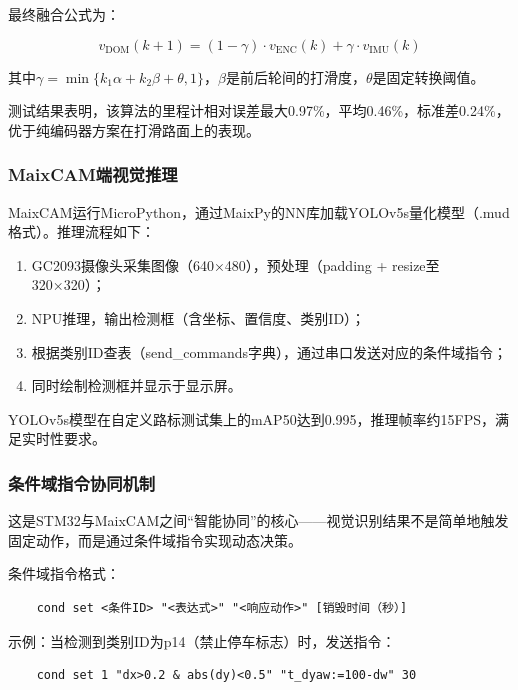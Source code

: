 最终融合公式为：

\begin{equation}
	v_{\text{DOM}}(k+1) = (1-\gamma) \cdot v_{\text{ENC}}(k) + \gamma \cdot v_{\text{IMU}}(k)
\end{equation}

其中\(\gamma = \min\{k_1 \alpha + k_2 \beta + \theta, 1\}\)，\(\beta\)是前后轮间的打滑度，\(\theta\)是固定转换阈值。

测试结果表明，该算法的里程计相对误差最大0.97\%，平均0.46\%，标准差0.24\%，优于纯编码器方案在打滑路面上的表现。

\subsubsection{MaixCAM端视觉推理}

MaixCAM运行MicroPython，通过MaixPy的NN库加载YOLOv5s量化模型（.mud格式）。推理流程如下：

\begin{enumerate}
	\item GC2093摄像头采集图像（640×480），预处理（padding + resize至320×320）；
	\item NPU推理，输出检测框（含坐标、置信度、类别ID）；
	\item 根据类别ID查表（send\_commands字典），通过串口发送对应的条件域指令；
	\item 同时绘制检测框并显示于显示屏。
\end{enumerate}

YOLOv5s模型在自定义路标测试集上的mAP50达到0.995，推理帧率约15FPS，满足实时性要求。

\subsubsection{条件域指令协同机制}

这是STM32与MaixCAM之间“智能协同”的核心——视觉识别结果不是简单地触发固定动作，而是通过条件域指令实现动态决策。

条件域指令格式：

\begin{lstlisting}
	cond set <条件ID> "<表达式>" "<响应动作>" [销毁时间（秒）]
\end{lstlisting}

示例：当检测到类别ID为p14（禁止停车标志）时，发送指令：

\begin{lstlisting}
	cond set 1 "dx>0.2 & abs(dy)<0.5" "t_dyaw:=100-dw" 30
\end{lstlisting}

